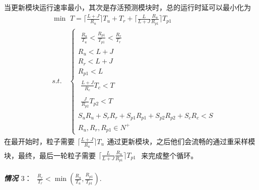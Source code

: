 当更新模块运行速率最小，其次是存活预测模块时，总的运行时延可以最小化为
\begin{equation}\label{Eq:09}
\begin{split}
&\min \,\, T=\lceil\frac{L+J}{R_u}\rceil T_{u}+T_{r}+\lceil\frac{L}{L+J}\frac{R_u}{R_{p1}}\rceil T_{p1}\\
&s.t.\quad  \left\{\begin{array}{l}
\begin{aligned}\frac{R_u}{T_u}<\frac{R_{p1}}{T_{p1}}<\frac{R_{r}}{T_{r}}\end{aligned} \\
R_{u}<L+J\\
R_{r}<L+J\\
R_{p1}<L \\
\begin{split} \frac{L+J}{R_c}T_c<T\end{split}\\
\begin{split}\frac{J}{R_{p2}}T_{p2}<T\end{split}\\
S_uR_{u}+S_rR_{r}+S_{p1}R_{p1}+S_{p2}R_{p2}+S_cR_{c}<S\\
R_{u},R_{r},R_{p1}\in N^+ \end{array}\right.
\end{split}
\end{equation}
在最开始时，粒子需要$\begin{aligned}\lceil \frac{L+J}{R_u}\rceil T_{u}\end{aligned}$通过更新模块，之后他们会流畅的通过重采样模块，最终，最后一轮粒子需要$\begin{aligned}\lceil\frac{L}{L+J}\frac{R_u}{R_{p1}}\rceil T_{p1}\end{aligned}$ 来完成整个循环。

\emph{\textbf{情况 $3$}}： $\begin{aligned}\frac{R_{r}}{T_{r}}< \min\left( \frac{R_{u}}{T_{u}},\frac{R_{p1}}{T_{p1}}\right).\end{aligned}$

